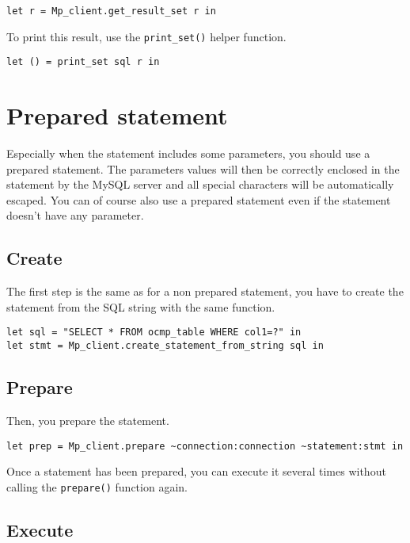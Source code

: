 \documentclass[a4paper, english, 11pt]{article}
\begin{document}
\begin{lstlisting}
let r = Mp_client.get_result_set r in
\end{lstlisting}

To print this result, use the \texttt{print\_set()} helper function.

\begin{lstlisting}
let () = print_set sql r in 
\end{lstlisting}

\section{Prepared statement}

Especially when the statement includes some parameters, you should use a prepared statement. The parameters values will then be correctly enclosed in the statement by the MySQL server and all special characters will be automatically escaped. You can of course also use a prepared statement even if the statement doesn't have any parameter.

\subsection{Create}

The first step is the same as for a non prepared statement, you have to create the statement from the SQL string with the same function.

\begin{lstlisting}
let sql = "SELECT * FROM ocmp_table WHERE col1=?" in
let stmt = Mp_client.create_statement_from_string sql in
\end{lstlisting}

\subsection{Prepare}

Then, you prepare the statement.

\begin{lstlisting}
let prep = Mp_client.prepare ~connection:connection ~statement:stmt in
\end{lstlisting}

Once a statement has been prepared, you can execute it several times without calling the \texttt{prepare()} function again. 

\subsection{Execute}
\end{document}
